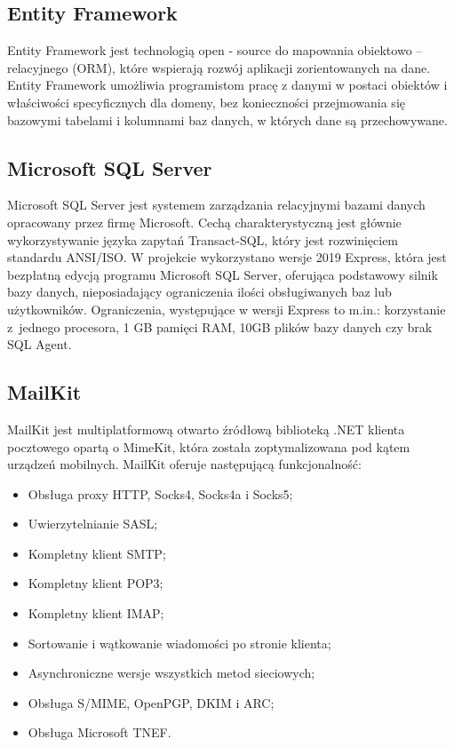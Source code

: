 \documentclass[12pt,a4paper]{article}
\begin{document}
		\subsection{Entity Framework}		 
		 	\indent Entity Framework jest technologią open - source do mapowania obiektowo – relacyjnego (ORM), które wspierają rozwój aplikacji zorientowanych na dane.
		 	Entity Framework umożliwia programistom pracę z danymi w postaci obiektów i właściwości specyficznych dla domeny, bez konieczności przejmowania się bazowymi
		 	tabelami i kolumnami baz danych, w których dane są przechowywane. 

		\subsection{Microsoft SQL Server}		 
		 	\indent Microsoft SQL Server jest systemem zarządzania relacyjnymi bazami danych opracowany przez firmę Microsoft. Cechą charakterystyczną jest głównie wykorzystywanie języka
		 	zapytań	Transact-SQL, który jest rozwinięciem standardu ANSI/ISO. W projekcie wykorzystano wersje 2019 Express, która jest bezpłatną edycją programu Microsoft SQL Server, oferująca
		 	podstawowy silnik bazy danych, nieposiadający ograniczenia ilości obsługiwanych baz lub użytkowników. Ograniczenia, występujące w wersji Express to  m.in.:
		 	korzystanie z~jednego procesora, 1 GB pamięci RAM, 10GB plików bazy danych czy brak SQL Agent.
		
		\subsection{MailKit}
			\indent MailKit jest multiplatformową otwarto źródłową biblioteką .NET klienta pocztowego opartą o MimeKit, która została zoptymalizowana pod kątem urządzeń mobilnych.
			MailKit oferuje następującą funkcjonalność:
			\begin{itemize}
				\item Obsługa proxy HTTP, Socks4, Socks4a i Socks5;
				\item Uwierzytelnianie SASL;
				\item Kompletny klient SMTP;
				\item Kompletny klient POP3;
				\item Kompletny klient IMAP;
				\item Sortowanie i wątkowanie wiadomości po stronie klienta;
				\item Asynchroniczne wersje wszystkich metod sieciowych;
				\item Obsługa S/MIME, OpenPGP, DKIM i ARC;
				\item Obsługa Microsoft TNEF.
			\end{itemize}
\end{document}
